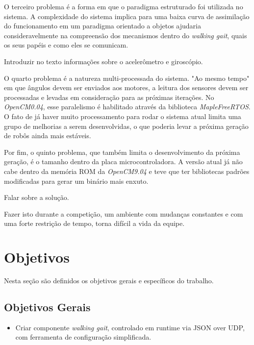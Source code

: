 O terceiro problema é a forma em que o paradigma estruturado foi utilizada no sistema. A complexidade do sistema implica para uma baixa curva de assimilação do funcionamento em um paradigma orientado a objetos ajudaria consideravelmente na compreensão dos mecanismos dentro do \textit{walking gait}, quais os seus papéis e como eles se comunicam.

\begin{TODO}
	Introduzir no texto informações sobre o acelerômetro e giroscópio.
\end{TODO}

O quarto problema é a natureza multi-processada do sistema. "Ao mesmo tempo" em que ângulos devem ser enviados aos motores, a leitura dos sensores devem ser processadas e levadas em consideração para as próximas iterações. No \textit{OpenCM0.04}, esse paralelismo é habilitado através da biblioteca \textit{MapleFreeRTOS}. O fato de já haver muito processamento para rodar o sistema atual limita uma grupo de melhorias a serem desenvolvidas, o que poderia levar a próxima geração de robôs ainda mais estáveis.

Por fim, o quinto problema, que também limita o desenvolvimento da próxima geração, é o tamanho dentro da placa microcontroladora. A versão atual já não cabe dentro da memória ROM da \textit{OpenCM9.04} e teve que ter bibliotecas padrões modificadas para gerar um binário mais enxuto.


\begin{guide}
	Falar sobre a solução.
\end{guide}


Fazer isto durante a competição, um ambiente com mudanças constantes e com uma forte
restrição de tempo, torna difícil a vida da equipe.

\section{Objetivos}

Nesta seção são definidos os objetivos gerais e específicos do trabalho.

\subsection{Objetivos Gerais}

\begin{itemize}
	\item Criar componente \textit{walking gait}, controlado em runtime via JSON over UDP, com ferramenta de configuração simplificada.
\end{itemize}

